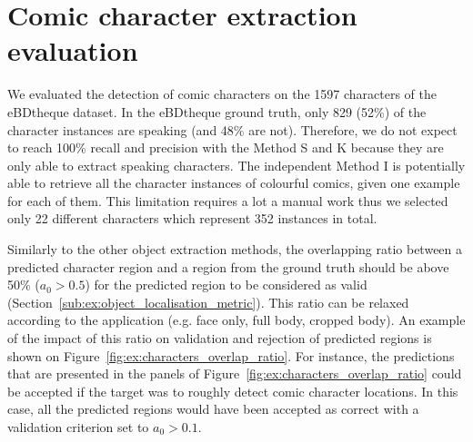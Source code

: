 




\section{Comic character extraction evaluation} %
\label{sec:comic_character_extraction_evaluation}
We evaluated the detection of comic characters on the 1597 characters of the eBDtheque dataset.
In the eBDtheque ground truth, only 829 (52\%) of the character instances are speaking (and 48\% are not).
Therefore, we do not expect to reach 100\% recall and precision with the Method S and K because they are only able to extract speaking characters.
The independent Method I is potentially able to retrieve all the character instances of colourful comics, given one example for each of them.
This limitation requires a lot a manual work thus we selected only 22 different characters which represent 352 instances in total.


Similarly to the other object extraction methods, the overlapping ratio between a predicted character region and a region from the ground truth should be above 50\% ($a_0>0.5$) for the predicted region to be considered as valid (Section~\ref{sub:ex:object_localisation_metric}).
This ratio can be relaxed according to the application (e.g. face only, full body, cropped body).
An example of the impact of this ratio on validation and rejection of predicted regions is shown on Figure~\ref{fig:ex:characters_overlap_ratio}.
For instance, the predictions that are presented in the panels of Figure~\ref{fig:ex:characters_overlap_ratio} could be accepted if the target was to roughly detect comic character locations.
In this case, all the predicted regions would have been accepted as correct with a validation criterion set to $a_0>0.1$.




